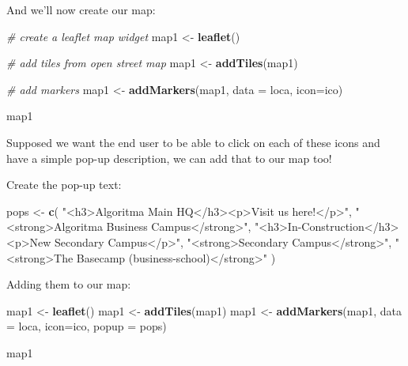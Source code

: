\documentclass[]{article}
\newenvironment{Shaded}{\begin{snugshade}}{\end{snugshade}}
\newcommand{\CommentTok}[1]{\textcolor[rgb]{0.56,0.35,0.01}{\textit{#1}}}
\newcommand{\DataTypeTok}[1]{\textcolor[rgb]{0.13,0.29,0.53}{#1}}
\newcommand{\KeywordTok}[1]{\textcolor[rgb]{0.13,0.29,0.53}{\textbf{#1}}}
\newcommand{\NormalTok}[1]{#1}
\newcommand{\StringTok}[1]{\textcolor[rgb]{0.31,0.60,0.02}{#1}}
\begin{document}
And we'll now create our map:

\begin{Shaded}
\begin{Highlighting}[]
\CommentTok{# create a leaflet map widget}
\NormalTok{map1 <-}\StringTok{ }\KeywordTok{leaflet}\NormalTok{()}

\CommentTok{# add tiles from open street map}
\NormalTok{map1 <-}\StringTok{ }\KeywordTok{addTiles}\NormalTok{(map1)}

\CommentTok{# add markers}
\NormalTok{map1 <-}\StringTok{ }\KeywordTok{addMarkers}\NormalTok{(map1, }\DataTypeTok{data =}\NormalTok{ loca, }\DataTypeTok{icon=}\NormalTok{ico)}

\NormalTok{map1}
\end{Highlighting}
\end{Shaded}

\hypertarget{htmlwidget-e10917d6bbe247ef6956}{}
\begin{leaflet}

\end{leaflet}

Supposed we want the end user to be able to click on each of these icons
and have a simple pop-up description, we can add that to our map too!

Create the pop-up text:

\begin{Shaded}
\begin{Highlighting}[]
\NormalTok{pops <-}\StringTok{ }\KeywordTok{c}\NormalTok{(}
    \StringTok{"<h3>Algoritma Main HQ</h3><p>Visit us here!</p>"}\NormalTok{,}
    \StringTok{"<strong>Algoritma Business Campus</strong>"}\NormalTok{, }
    \StringTok{"<h3>In-Construction</h3><p>New Secondary Campus</p>"}\NormalTok{,}
    \StringTok{"<strong>Secondary Campus</strong>"}\NormalTok{,}
    \StringTok{"<strong>The Basecamp (business-school)</strong>"}
\NormalTok{)}
\end{Highlighting}
\end{Shaded}

Adding them to our map:

\begin{Shaded}
\begin{Highlighting}[]
\NormalTok{map1 <-}\StringTok{ }\KeywordTok{leaflet}\NormalTok{()}
\NormalTok{map1 <-}\StringTok{ }\KeywordTok{addTiles}\NormalTok{(map1)}
\NormalTok{map1 <-}\StringTok{ }\KeywordTok{addMarkers}\NormalTok{(map1, }\DataTypeTok{data =}\NormalTok{ loca, }\DataTypeTok{icon=}\NormalTok{ico, }\DataTypeTok{popup =}\NormalTok{ pops)}

\NormalTok{map1}
\end{Highlighting}
\end{Shaded}
\end{document}
